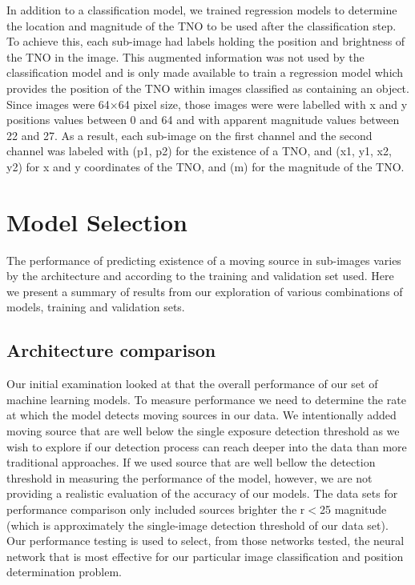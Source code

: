 \documentclass{aastex631}
\begin{document}
In addition to a classification model, we trained regression models to determine the location and magnitude of the TNO to be used after the classification step.
To achieve this, each sub-image had labels holding the position and brightness of the TNO in the image.
This augmented information was not used by the classification model and is only made available to train a regression model which provides the position of the TNO within images classified as containing an object.
Since images were 64$\times$64 pixel size, those images were were labelled with x and y positions values between 0 and 64 and with apparent magnitude values between 22 and 27.
As a result, each sub-image on the first channel and the second channel was labeled with (p1, p2) for the existence of a TNO, and (x1, y1, x2, y2) for x and y coordinates of the TNO, and (m) for the magnitude of the TNO.

\section{Model Selection}
\label{sect: Model Selection}
The performance of predicting existence of a moving source in sub-images varies by the architecture and according to the training and validation set used.
Here we present a summary of results from our exploration of various combinations of models, training and validation sets.
 
\subsection{Architecture comparison}
\label{subsect:Architecture comparison}
Our initial examination looked at that the overall performance of our set of machine learning models.
To measure performance we need to determine the rate at which the model detects moving sources in our data.  
We intentionally added moving source that are well below the single exposure detection threshold as we wish to explore if our detection process can reach deeper into the data than more traditional approaches.
If we used source that are well bellow the detection threshold in measuring the performance of the model, however, we are not providing a realistic evaluation of the accuracy of our models.
The data sets for performance comparison only included sources brighter the r$<$25 magnitude (which is approximately the single-image detection threshold of our data set).  
Our performance testing is used to select, from those networks tested, the neural network that is most effective for our particular image classification and position determination problem.
\end{document}
